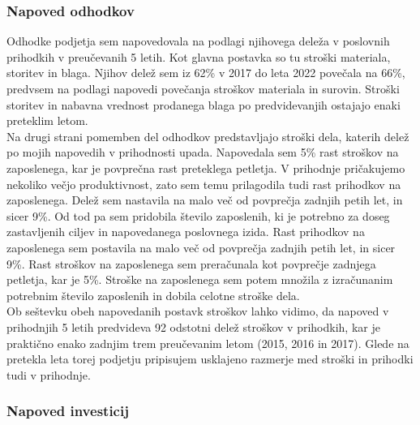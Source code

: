 \documentclass[12pt,a4paper]{amsart}
\theoremstyle{definition} %
\theoremstyle{plain} %
\begin{document}
\subsubsection{Napoved odhodkov}
Odhodke podjetja sem napovedovala na podlagi njihovega deleža v poslovnih prihodkih v preučevanih 5 letih. Kot glavna postavka so tu stroški materiala, storitev in blaga. Njihov delež sem iz 62\% v 2017 do leta 2022 povečala na 66\%, predvsem na podlagi napovedi povečanja stroškov materiala in surovin. Stroški storitev in nabavna vrednost prodanega blaga po predvidevanjih ostajajo enaki preteklim letom.\\
Na drugi strani pomemben del odhodkov predstavljajo stroški dela, katerih delež po mojih napovedih v prihodnosti upada. Napovedala sem 5\% rast stroškov na zaposlenega, kar je povprečna rast preteklega petletja. V prihodnje pričakujemo nekoliko večjo produktivnost, zato sem temu prilagodila tudi rast prihodkov na zaposlenega. Delež sem nastavila na malo več od povprečja zadnjih petih let, in sicer 9\%. Od tod pa sem pridobila število zaposlenih, ki je potrebno za doseg zastavljenih ciljev in napovedanega poslovnega izida. Rast prihodkov na zaposlenega sem postavila na malo več od povprečja zadnjih petih let, in sicer 9\%. Rast stroškov na zaposlenega sem preračunala kot povprečje zadnjega petletja, kar je 5\%. Stroške na zaposlenega sem potem množila z izračunanim potrebnim število zaposlenih in dobila celotne stroške dela.  \\
Ob seštevku obeh napovedanih postavk stroškov lahko vidimo, da napoved v prihodnjih 5 letih predvideva 92 odstotni delež stroškov v prihodkih, kar je praktično enako zadnjim trem preučevanim letom (2015, 2016 in 2017). Glede na pretekla leta torej podjetju pripisujem usklajeno razmerje med stroški in prihodki tudi v prihodnje.


\subsubsection{Napoved investicij}
\end{document}
